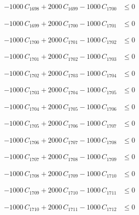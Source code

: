 \documentclass[a4paper,11pt]{article}
\begin{document}
\begin{align}
-1000\,C_{1698} + 2000\,C_{1699} - 1000\,C_{1700} &\leq 0 \nonumber
\end{align}

\begin{align}
-1000\,C_{1699} + 2000\,C_{1700} - 1000\,C_{1701} &\leq 0 \nonumber
\end{align}

\begin{align}
-1000\,C_{1700} + 2000\,C_{1701} - 1000\,C_{1702} &\leq 0 \nonumber
\end{align}

\begin{align}
-1000\,C_{1701} + 2000\,C_{1702} - 1000\,C_{1703} &\leq 0 \nonumber
\end{align}

\begin{align}
-1000\,C_{1702} + 2000\,C_{1703} - 1000\,C_{1704} &\leq 0 \nonumber
\end{align}

\begin{align}
-1000\,C_{1703} + 2000\,C_{1704} - 1000\,C_{1705} &\leq 0 \nonumber
\end{align}

\begin{align}
-1000\,C_{1704} + 2000\,C_{1705} - 1000\,C_{1706} &\leq 0 \nonumber
\end{align}

\begin{align}
-1000\,C_{1705} + 2000\,C_{1706} - 1000\,C_{1707} &\leq 0 \nonumber
\end{align}

\begin{align}
-1000\,C_{1706} + 2000\,C_{1707} - 1000\,C_{1708} &\leq 0 \nonumber
\end{align}

\begin{align}
-1000\,C_{1707} + 2000\,C_{1708} - 1000\,C_{1709} &\leq 0 \nonumber
\end{align}

\begin{align}
-1000\,C_{1708} + 2000\,C_{1709} - 1000\,C_{1710} &\leq 0 \nonumber
\end{align}

\begin{align}
-1000\,C_{1709} + 2000\,C_{1710} - 1000\,C_{1711} &\leq 0 \nonumber
\end{align}

\begin{align}
-1000\,C_{1710} + 2000\,C_{1711} - 1000\,C_{1712} &\leq 0 \nonumber
\end{align}
\end{document}
